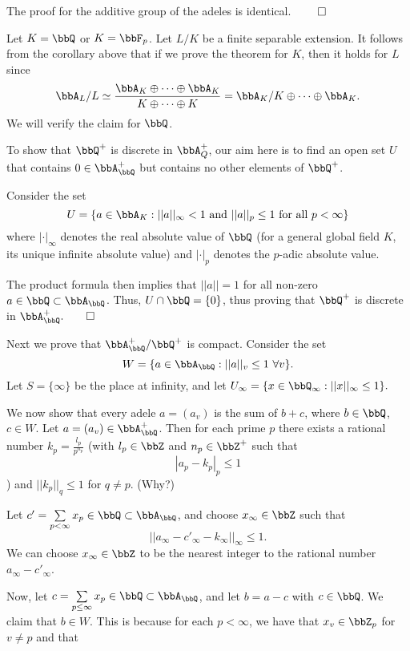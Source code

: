 \documentclass[a4paper, 12pt,oneside,openany]{book}
\begin{document}
The proof for the additive group of the adeles is identical. $\qed$


 Let $K=\bbQ$ or $K=\bbF_p$. Let $L/K$ be a finite separable extension. It follows from the corollary above that if we prove the theorem for $K$, then it holds for $L$ since $$\bbA_L/L \simeq \frac{\bbA_K \oplus \dots \oplus \bbA_K}{K \oplus \dots \oplus K}=\bbA_K/K \oplus \dots\oplus \bbA_K.$$ We will verify the claim for $\bbQ$.

To show that $\bbQ^+$ is discrete in $\bbA_Q^+$, our aim here is to find an open set $U$ that contains $0\in \bbA_\bbQ^+$ but contains no other elements of $\bbQ^+$. 

Consider the set $$U= \{a \in \bbA_K: ||a||_{\infty} <1\ \text{and}\ ||a||_p \leq 1\ \text{for all}\ p<\infty\}$$ where $|\cdot|_\infty$ denotes the real absolute value of $\bbQ$ (for a general global field $K$, its unique infinite absolute value) and $|\cdot|_p$ denotes the $p$-adic absolute value. 

The product formula then implies that $||a||=1$ for all non-zero $a \in \bbQ \subset \bbA_\bbQ$. Thus, $U \cap \bbQ = \{0\}$, thus proving that $\bbQ^+$ is discrete in $\bbA_\bbQ^+. \qed$ 

Next we prove that $\bbA_\bbQ^+/\bbQ^+$ is compact. Consider the set $$W=\{a \in \bbA_\bbQ: ||a||_v \leq 1\ \forall v\}.$$ Let $S=\{\infty\}$ be the place at infinity, and let $U_{\infty}=\{x \in \bbQ_{\infty}:||x||_{\infty} \leq 1\}.$ 

We now show that every adele $a=(a_v)$ is the sum of $b+c$, where $b\in\bbQ$, $c \in W$. Let $a=(a_v) \in \bbA_{\bbQ}^+$. Then for each prime $p$ there exists a rational number $k_p = \frac{l_p}{p^{n_p}}$ (with $l_p \in \bbZ$ and $n_p \in \bbZ^+$ such that $$|a_p-k_p|_p \leq 1$$) and $||k_p||_{q} \leq 1$ for $q \neq p$. (Why?)  

Let $c'=\sum\limits_{p<\infty} x_p \in \bbQ \subset \bbA_\bbQ$, and choose $x_\infty \in \bbZ$ such that $$||a_\infty-c'_\infty-k_\infty||_{\infty} \leq 1.$$ We can choose $x_{\infty} \in \bbZ$ to be the nearest integer to the rational number $a_\infty-c'_\infty$. 

Now, let $c=\sum\limits_{p\leq\infty} x_p \in \bbQ \subset \bbA_\bbQ$, and let $b=a-c$ with $c \in \bbQ$. We claim that $b\in W$. This is because for each $p<\infty$, we have that $x_v \in \bbZ_p$ for $v\neq p$ and that 
\end{document}
